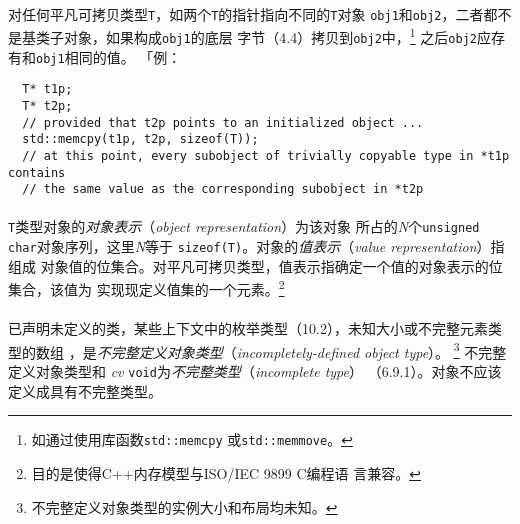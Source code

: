 \paragraph{}
对任何平凡可拷贝类型\texttt{T}，如两个\texttt{T}的指针指向不同的\texttt{T}对象
\texttt{obj1}和\texttt{obj2}，二者都不是基类子对象，如果构成\texttt{obj1}的底层
字节（4.4）拷贝到\texttt{obj2}中，\footnote{如通过使用库函数\texttt{std::memcpy}
或\texttt{std::memmove}。} 之后\texttt{obj2}应存有和\texttt{obj1}相同的值。
「例：
\begin{lstlisting}
  T* t1p;
  T* t2p;
  // provided that t2p points to an initialized object ...
  std::memcpy(t1p, t2p, sizeof(T));
  // at this point, every subobject of trivially copyable type in *t1p contains
  // the same value as the corresponding subobject in *t2p
\end{lstlisting}

\paragraph{}
\texttt{T}类型对象的\textit{对象表示}（\textit{object representation}）为该对象
所占的\textit{N}个\texttt{unsigned char}对象序列，这里\textit{N}等于
\texttt{sizeof(T)}。对象的\textit{值表示}（\textit{value representation}）指组成
对象值的位集合。对平凡可拷贝类型，值表示指确定一个值的对象表示的位集合，该值为
实现现定义值集的一个元素。\footnote{目的是使得C++内存模型与ISO/IEC 9899 C编程语
言兼容。}

\paragraph{}
已声明未定义的类，某些上下文中的枚举类型（10.2），未知大小或不完整元素类型的数组
，是\textit{不完整定义对象类型}（\textit{incompletely-defined object type}）。
\footnote{不完整定义对象类型的实例大小和布局均未知。} 不完整定义对象类型和
\textit{cv} \texttt{void}为\textit{不完整类型}（\textit{incomplete type}）
（6.9.1）。对象不应该定义成具有不完整类型。

